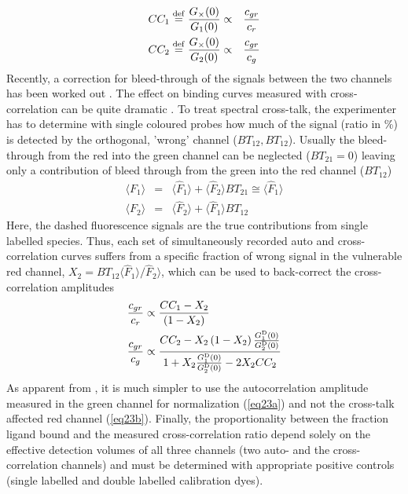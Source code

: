 	\begin{eqnarray}
	\label{eq21}
	CC_1 \stackrel{\rm def}{=} \frac{G_\times(0)}{G_1(0)} & \propto & \frac{c_{gr}}{c_r} \nonumber \\ CC_2 \stackrel{\rm def}{=} \frac{G_\times(0)}{G_2(0)} &\propto & \frac{c_{gr}}{c_g}
	\end{eqnarray}
Recently, a correction for bleed-through of the signals between the two channels has been worked out \cite{Bacia2012}. The effect on binding curves measured with cross-correlation can be quite dramatic \cite{Weidemann2013}. To treat spectral cross-talk, the experimenter has to determine with single coloured probes how much of the signal (ratio in \%) is detected by the orthogonal, 'wrong' channel ($BT_{12}, BT_{12}$). Usually the bleed-through from the red into the green channel can be neglected ($BT_{21} = 0$) leaving only a contribution of bleed through from the green into the red channel ($BT_{12}$)
	\begin{eqnarray}
	\label{eq22}
	\langle F_1 \rangle & = & \langle \hat{F}_1 \rangle + \langle \hat{F}_2 \rangle BT_{21} \cong  \langle \hat{F}_1 \rangle \nonumber \\ \langle F_2 \rangle & = & \langle \hat{F}_2 \rangle + \langle \hat{F}_1 \rangle BT_{12}
	\end{eqnarray}
Here, the dashed fluorescence signals are the true contributions from single labelled species. Thus, each set of simultaneously recorded auto and cross-correlation curves suffers from a specific fraction of wrong signal in the vulnerable red channel, $X_2 = BT_{12} \langle \hat{F}_1 \rangle/\hat{F}_2 \rangle$, which can be used to back-correct the cross-correlation amplitudes  \cite{Bacia2012,Weidemann2013}
\begin{subequations}
\label{eq23}
  \begin{align}
    \frac{c_{gr}}{c_r} & \propto  \frac{CC_1-X_2}{\left( 1-X_2 \right)} \label{eq23a} \\
    \frac{c_{gr}}{c_g} & \propto  \frac{CC_2-X_2 \left( 1-X_2 \right) \frac{G_1^{\rm D}(0)}{G_2^{\rm D}(0)}}{1+ X_2 \frac{G_1^{\rm D}(0)}{G_2^{\rm D}(0)} - 2 X_2 CC_2} \label{eq23b}
  \end{align}
\end{subequations}
As apparent from , it is much simpler to use the autocorrelation amplitude measured in the green channel for normalization (\ref{eq23a}) and not the cross-talk affected red  channel (\ref{eq23b}). Finally, the proportionality between the fraction ligand bound and the measured cross-correlation ratio depend solely on the effective detection volumes of all three channels (two auto- and the cross-correlation channels) and must be determined with appropriate positive controls (single labelled and double labelled calibration dyes).

